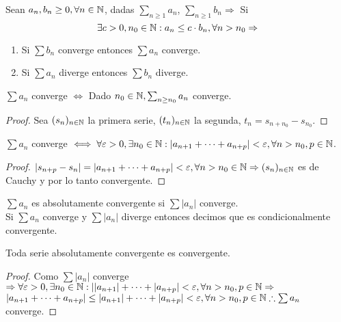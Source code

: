\begin{corollary}
  Sean $a_n, b_n \geq 0, \forall n \in \mathbb{N}$, dadas $\sum_{n \geq 1} a_n$, $\sum_{n \geq 1} b_n \Rightarrow$ Si \begin{equation}
    \exists c > 0, n_0 \in \mathbb{N} : a_n \leq c \cdot b_n, \forall n > n_0 \Rightarrow
  \end{equation}
  \begin{enumerate}
    \item Si $\sum b_n$ converge entonces $\sum a_n$ converge.
    \item Si $\sum a_n$ diverge entonces $\sum b_n$ diverge.
  \end{enumerate}

  \begin{note}
    $\sum a_n$ converge $\iff$ Dado $n_0 \in \mathbb{N}, \sum_{n \geq n_0} a_n$ converge.
  \end{note}
  \begin{proof}
    Sea $(s_n)_{n \in \mathbb{N}}$ la primera serie, $(t_n)_{n \in \mathbb{N}}$ la segunda, $t_n = s_{n + n_0} - s_{n_0}$.
  \end{proof}
\end{corollary}

\begin{theorem}
  $\sum a_n$ converge $\iff \forall \varepsilon > 0, \exists n_0 \in \mathbb{N} : | a_{n+1} + \cdots + a_{n+p} | < \varepsilon, \forall n > n_0, p \in \mathbb{N}$.
  \begin{proof}
    $|s_{n+p} - s_n| = |a_{n+1} + \cdots + a_{n+p}| < \varepsilon, \forall n > n_0 \in \mathbb{N} \Rightarrow (s_n)_{n \in \mathbb{N}}$ es de Cauchy y por lo tanto convergente.
  \end{proof}
\end{theorem}

\begin{definition}
  $\sum a_n$ es absolutamente convergente si $\sum |a_n|$ converge. \\
  Si $\sum a_n$ converge y $\sum |a_n|$ diverge entonces decimos que es condicionalmente convergente.
\end{definition}

\begin{theorem}
  Toda serie absolutamente convergente es convergente.
  \begin{proof}
    Como $\sum |a_n|$ converge $\Rightarrow \forall \varepsilon > 0, \exists n_0 \in \mathbb{N} : | |a_{n+1}| + \cdots + |a_{n+p}| < \varepsilon, \forall n > n_0, p \in \mathbb{N} \Rightarrow$ \\
    $|a_{n+1} + \cdots + a_{n+p}| \leq |a_{n+1}| + \cdots + |a_{n+p}| < \varepsilon, \forall n > n_0, p \in \mathbb{N} \therefore \sum a_n$ converge.
  \end{proof}
\end{theorem}
